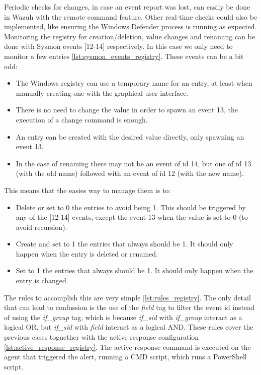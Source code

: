 Periodic checks for changes, in case an event report was lost, can easily be done in Wazuh with the remote command feature.
Other real-time checks could also be implemented, like ensuring the Windows Defender process is running as expected.
\linej
Monitoring the registry for creation/deletion, value changes and renaming can be done with Sysmon events [12-14] respectively.
In this case we only need to monitor a few entries \ref{lst:sysmon_events_registry}.
These events can be a bit odd:
\begin{itemize}
	\item The Windows registry can use a temporary name for an entry, at least when manually creating one with the graphical user interface.
	\item There is no need to change the value in order to spawn an event 13, the execution of a change command is enough.
	\item An entry can be created with the desired value directly, only spawning an event 13.
	\item In the case of renaming there may not be an event of id 14, but one of id 13 (with the old name) followed with an event of id 12 (with the new name).
\end{itemize}
\linej
This means that the easies way to manage them is to:
\begin{itemize}
	\item Delete or set to 0 the entries to avoid being 1. This should be triggered by any of the [12-14] events, except the event 13 when the value is set to 0 (to avoid recursion).
	\item Create and set to 1 the entries that always should be 1. It should only happen when the entry is deleted or renamed.
	\item Set to 1 the entries that always should be 1. It should only happen when the entry is changed.
\end{itemize}
\linej
The rules to accomplish this are very simple \ref{lst:rules_registry}.
The only detail that can lead to confussion is the use of the \textit{field} tag to filter the event id instead of using the \textit{if\_group} tag, which is because \textit{if\_sid} with \textit{if\_group} interact as a logical OR, but \textit{if\_sid} with \textit{field} interact as a logical AND.
\linej
These rules cover the previous cases toguether with the active response configuration \ref{lst:active_response_registry}.
\linej
\linej
The active response command is executed on the agent that triggered the alert, running a CMD script, which runs a PowerShell script.
